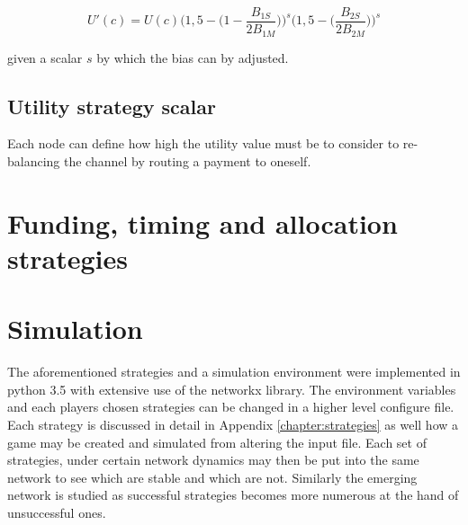 \[ U'(c) = U(c) \bigg(1,5 - \big(1 - \dfrac{B_{1S}}{2B_{1M}}\big) \bigg)^s \bigg(1,5 - \big(\dfrac{B_{2S}}{2B_{2M}}\big)\bigg)^s  \]

given a scalar $s$ by which the bias can by adjusted.

\subsection{Utility strategy scalar}

Each node can define how high the utility value must be to consider to re-balancing the channel by routing a payment to oneself.


\section{Funding, timing and allocation strategies}

\section{Simulation}

The aforementioned strategies and a simulation environment were implemented in python 3.5 with extensive use of the networkx library. The environment variables and each players chosen strategies can be changed in a higher level configure file. Each strategy is discussed in detail in Appendix \ref{chapter:strategies} as well how a game may be created and simulated from altering the input file. Each set of strategies, under certain network dynamics may then be put into the same network to see which are stable and which are not. Similarly the emerging network is studied as successful strategies becomes more numerous at the hand of unsuccessful ones. 




